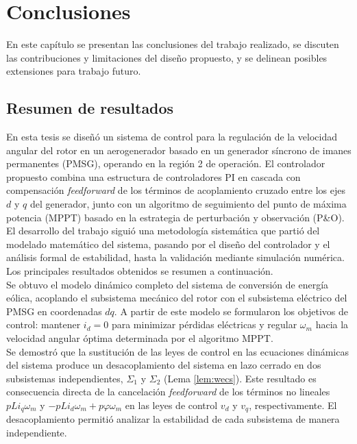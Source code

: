 \chapter{Conclusiones}
\label{ch:conclusiones}

En este capítulo se presentan las conclusiones del trabajo realizado, se 
discuten las contribuciones y limitaciones del diseño propuesto, y se delinean 
posibles extensiones para trabajo futuro.

\section{Resumen de resultados}

En esta tesis se diseñó un sistema de control para la regulación de la 
velocidad angular del rotor en un aerogenerador basado en un generador 
síncrono de imanes permanentes (PMSG), operando en la región 2 de operación. 
El controlador propuesto combina una estructura de controladores PI en cascada 
con compensación \textit{feedforward} de los términos de acoplamiento cruzado 
entre los ejes $d$ y $q$ del generador, junto con un algoritmo de seguimiento 
del punto de máxima potencia (MPPT) basado en la estrategia de perturbación y 
observación (P\&O).
\\

El desarrollo del trabajo siguió una metodología sistemática que partió del 
modelado matemático del sistema, pasando por el diseño del controlador y el 
análisis formal de estabilidad, hasta la validación mediante simulación 
numérica. Los principales resultados obtenidos se resumen a continuación.
\\

Se obtuvo el modelo dinámico completo del sistema de conversión de energía 
eólica, acoplando el subsistema mecánico del rotor con el subsistema eléctrico 
del PMSG en coordenadas $dq$. A partir de este modelo se formularon los 
objetivos de control: mantener $i_d = 0$ para minimizar pérdidas eléctricas y 
regular $\omega_m$ hacia la velocidad angular óptima determinada por el 
algoritmo MPPT.
\\

Se demostró que la sustitución de las leyes de control en las ecuaciones 
dinámicas del sistema produce un desacoplamiento del sistema en lazo cerrado 
en dos subsistemas independientes, $\Sigma_1$ y $\Sigma_2$ (Lema \ref{lem:wecs}). Este 
resultado es consecuencia directa de la cancelación \textit{feedforward} de los 
términos no lineales $pL i_q \omega_m$ y $-pL i_d \omega_m + p\varphi\omega_m$ 
en las leyes de control $v_d$ y $v_q$, respectivamente. El desacoplamiento 
permitió analizar la estabilidad de cada subsistema de manera independiente.
\\

